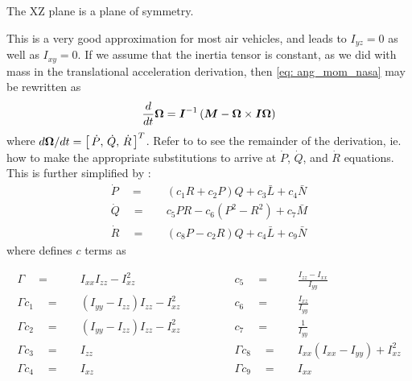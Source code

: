 \documentclass[12pt]{ucthesis}
\begin{document}
	\begin{ass}
	The XZ plane is a plane of symmetry.
	\label{ass: sym}
	\end{ass}

\noindent This is a very good approximation for most air vehicles, and leads to $I_{yz} = 0$ as well as $I_{xy} = 0$. If we assume that the inertia tensor is constant, as we did with mass in the translational acceleration derivation, then \autoref{eq: ang_mom_nasa} may be rewritten as
%
	\begin{equation}
		\frac{d}{dt} \boldsymbol{\Omega} = \boldsymbol{I}^{-1} \left( \boldsymbol{M} - \boldsymbol{\Omega} \times \boldsymbol{I}\boldsymbol{\Omega} \right)
		\label{eq: ang_mom_nasa_re}
	\end{equation}
%
where $ d\boldsymbol{\Omega}/dt  = \left[ \, \dot{P}, \, \dot{Q}, \, \dot{R} \, \right]^T$.
%
%
Refer to \citet[Sec. 1.2.1]{Duke1988} to see the remainder of the derivation, ie. how to make the appropriate substitutions to arrive at $\dot{P}$, $\dot{Q}$, and $\dot{R}$ equations. This is further simplified by \citet[Pg. 80]{Stevens1992}:
%
	\begin{align*}
		\dot{P} \quad=\quad& 	\left(c_1 R + c_2 P \right)Q + c_3 \bar{L} + c_4 \bar{N} \\
		\dot{Q} \quad=\quad& 	c_5 PR - c_6 \left( P^2 - R^2\right) + c_7 \bar{M} \\
		\dot{R} \quad=\quad& 	\left( c_8 P - c_2 R \right) Q + c_4 \bar{L} + c_9 \bar{N}
	\end{align*}
where \citep{Stevens1992} defines $c$ terms as

	\begin{equation} \label{eq: stevens_c}
		\begin{aligned}
			\Gamma     \quad=\quad	& I_{xx} I_{zz} - I_{xz}^2 \qquad \qquad & c_5 \quad=\quad 	& \frac{I_{zz} - I_{xx}}{I_{yy}}\\
			\Gamma c_1 \quad=\quad 	& \left( I_{yy} - I_{zz} \right) I_{zz} - I_{xz}^2 \qquad \qquad & c_6 \quad=\quad 	& \frac{I_{xz}}{I_{yy}}\\
			\Gamma c_2 \quad=\quad 	& \left( I_{yy} - I_{zz}\right) I_{zz} - I_{xz}^2 \qquad \qquad & c_7 \quad=\quad 	& \frac{1}{I_{yy}}\\
			\Gamma c_3 \quad=\quad 	& I_{zz} \qquad \qquad & \Gamma c_8 \quad=\quad 	& I_{xx}\left(I_{xx} - I_{yy}\right) + I_{xz}^2\\
			\Gamma c_4 \quad=\quad 	& I_{xz} \qquad \qquad & \Gamma c_9 \quad=\quad 	& I_{xx}\\
		\end{aligned}
	\end{equation}
%
\end{document}
